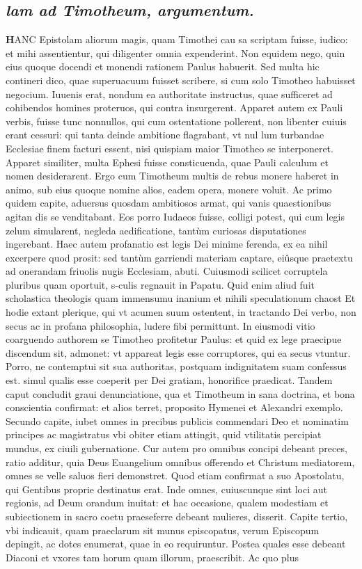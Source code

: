 \documentclass{article}
\begin{document}
\begin{pages}
\subsection*{\textit{lam ad Timotheum, argumentum. }}\pstart \huge\textbf{H}\normalsize ANC Epistolam aliorum magis, quam Timothei cau sa scriptam fuisse, iudico: et mihi assentientur, qui diligenter omnia expenderint. Non equidem nego, quin eius quoque docendi et monendi rationem Paulus habuerit. Sed multa hic contineri dico, quae superuacuum fuisset scribere, si cum solo Timotheo habuisset negocium. Iuuenis erat, nondum ea authoritate instructus, quae sufficeret ad cohibendos homines proteruos, qui contra insurgerent. Apparet autem ex Pauli verbis, fuisse tunc nonnullos, qui cum ostentatione pollerent, non libenter cuiuis erant cessuri: qui tanta deinde ambitione flagrabant, vt nul lum turbandae Ecclesiae finem facturi essent, nisi quispiam maior Timotheo se interponeret. Apparet similiter, multa Ephesi fuisse consticuenda, quae Pauli calculum et nomen desiderarent. Ergo cum Timotheum multis de rebus monere haberet in animo, sub eius quoque nomine alios, eadem opera, monere voluit. Ac primo quidem capite, aduersus quosdam ambitiosos armat, qui vanis quaestionibus agitan dis se venditabant. Eos porro Iudaeos fuisse, colligi potest, qui cum legis zelum simularent, negleda aedificatione, tantùm curiosas disputationes ingerebant. Haec autem profanatio est legis Dei minime ferenda, ex ea nihil excerpere quod prosit: sed tantùm garriendi materiam captare, eiûsque praetextu ad onerandam friuolis nugis Ecclesiam, abuti. Cuiusmodi scilicet corruptela pluribus quam oportuit, s-culis regnauit in Papatu. Quid enim aliud fuit scholastica theologis quam immensumu inanium et nihili speculationum chaost Et hodie extant plerique, qui vt acumen suum ostentent, in tractando Dei verbo, non secus ac in profana philosophia, ludere fibi permittunt. In eiusmodi vitio coarguendo authorem se Timotheo profitetur Paulus: et quid ex lege praecipue discendum sit, admonet: vt appareat legis esse corruptores, qui ea secus vtuntur. Porro, ne contemptui sit sua authoritas, postquam indignitatem suam confessus est. simul qualis esse coeperit per Dei gratiam, honorifice praedicat. Tandem caput concludit graui denunciatione, qua et Timotheum in sana doctrina, et bona conscientia confirmat: et alios terret, proposito Hymenei et Alexandri exemplo. Secundo capite, iubet omnes in precibus publicis commendari Deo et nominatim principes ac magistratus vbi obiter etiam attingit, quid vtilitatis percipiat mundus, ex ciuili gubernatione. Cur autem pro omnibus concipi debeant preces, ratio additur, quia Deus Euangelium omnibus offerendo et Christum mediatorem, omnes se velle saluos fieri demonstret. Quod  \pend\pstart etiam confirmat a suo Apostolatu, qui Gentibus proprie destinatus erat. Inde omnes, cuiuscunque sint loci aut regionis, ad Deum orandum inuitat: et hac occasione, qualem modestiam et subiectionem in sacro coetu praeseferre debeant mulieres, disserit. Capite tertio, vbi indicauit, quam praeclarum sit munus episcopatus, verum Episcopum depingit, ac dotes enumerat, quae in eo requiruntur. Postea quales esse debeant Diaconi et vxores tam horum quam illorum, praescribit. Ac quo plus 
\end{pages}
\end{document}
